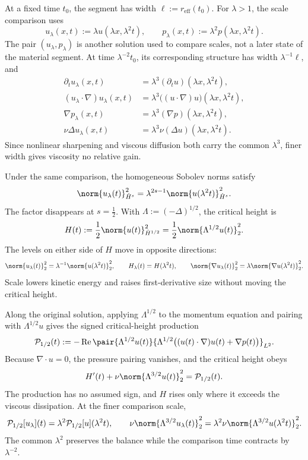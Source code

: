 
At a fixed time \(t_0\), the segment has width
\(\ell:=r_{\mathrm{eff}}(t_0)\).
For \(\lambda>1\), the scale comparison uses
\[
  u_\lambda(x,t)
  :=
  \lambda u(\lambda x,\lambda^2t),
  \qquad
  p_\lambda(x,t)
  :=
  \lambda^2p(\lambda x,\lambda^2t).
\]
The pair \((u_\lambda,p_\lambda)\) is another solution used to compare scales, not a later state of the material segment.
At time \(\lambda^{-2}t_0\), its corresponding structure has width \(\lambda^{-1}\ell\), and
\[
\begin{aligned}
  \partial_tu_\lambda(x,t)
  &=
  \lambda^3(\partial_tu)(\lambda x,\lambda^2t),
  \\
  (u_\lambda\cdot\nabla)u_\lambda(x,t)
  &=
  \lambda^3\bigl((u\cdot\nabla)u\bigr)(\lambda x,\lambda^2t),
  \\
  \nabla p_\lambda(x,t)
  &=
  \lambda^3(\nabla p)(\lambda x,\lambda^2t),
  \\
  \nu\Delta u_\lambda(x,t)
  &=
  \lambda^3\nu(\Delta u)(\lambda x,\lambda^2t).
\end{aligned}
\]
Since nonlinear sharpening and viscous diffusion both carry the common \(\lambda^3\), finer width gives viscosity no relative gain.


Under the same comparison, the homogeneous Sobolev norms satisfy
\[
  \norm{u_\lambda(t)}_{\dot H^s}^2
  =
  \lambda^{2s-1}
  \norm{u(\lambda^2t)}_{\dot H^s}^2.
\]
The factor disappears at \(s=\tfrac12\).
With \(\Lambda:=(-\Delta)^{1/2}\), the critical height is
\[
  H(t)
  :=
  \frac12\norm{u(t)}_{\dot H^{1/2}}^2
  =
  \frac12\norm{\Lambda^{1/2}u(t)}_2^2.
\]
The levels on either side of \(H\) move in opposite directions:
\[
  \norm{u_\lambda(t)}_2^2
  =
  \lambda^{-1}\norm{u(\lambda^2t)}_2^2,
  \qquad
  H_\lambda(t)=H(\lambda^2t),
  \qquad
  \norm{\nabla u_\lambda(t)}_2^2
  =
  \lambda\norm{\nabla u(\lambda^2t)}_2^2.
\]
Scale lowers kinetic energy and raises first-derivative size without moving the critical height.


Along the original solution, applying \(\Lambda^{1/2}\) to the momentum equation and pairing with \(\Lambda^{1/2}u\) gives the signed critical-height production
\[
  \mathcal P_{1/2}(t)
  :=
  -\operatorname{Re}
  \pair
    {\Lambda^{1/2}u(t)}
    {\Lambda^{1/2}\bigl((u(t)\cdot\nabla)u(t)+\nabla p(t)\bigr)}_{L^2}.
\]
Because \(\nabla\cdot u=0\), the pressure pairing vanishes, and the critical height obeys
\[
  H'(t)
  +
  \nu\norm{\Lambda^{3/2}u(t)}_2^2
  =
  \mathcal P_{1/2}(t).
\]
The production has no assumed sign, and \(H\) rises only where it exceeds the viscous dissipation.
At the finer comparison scale,
\[
  \mathcal P_{1/2}[u_\lambda](t)
  =
  \lambda^2\mathcal P_{1/2}[u](\lambda^2t),
  \qquad
  \nu\norm{\Lambda^{3/2}u_\lambda(t)}_2^2
  =
  \lambda^2\nu\norm{\Lambda^{3/2}u(\lambda^2t)}_2^2.
\]
The common \(\lambda^2\) preserves the balance while the comparison time contracts by \(\lambda^{-2}\).

